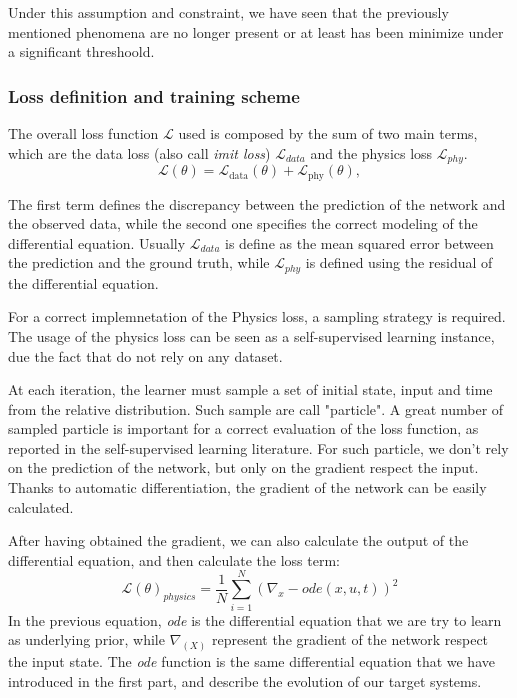 Under this assumption and constraint, we have seen that the previously mentioned phenomena are no longer present or at least has been minimize under a significant threshoold.

\subsubsection{Loss definition and training scheme}

The overall loss function $\mathcal{L}$ used is composed by the sum of two main terms, which are the data loss (also call \textit{imit loss}) $\mathcal{L}_{data}$ and the physics loss $\mathcal{L}_{phy}$. 
\begin{equation}
    \mathcal{L}(\theta) = \mathcal{L}_{\text{data}}(\theta) + \mathcal{L}_{\text{phy}}(\theta),
\end{equation}

The first term defines the discrepancy between the prediction of the network and the observed data, while the second one specifies the correct modeling of the differential equation.
Usually $\mathcal{L}_{data}$ is define as the mean squared error between the prediction and the ground truth, while $\mathcal{L}_{phy}$ is defined using the residual of the differential equation.

For a correct implemnetation of the Physics loss, a sampling strategy is required. The usage of the physics loss can be seen as a self-supervised learning instance, due the fact that do not rely on any dataset.

At each iteration, the learner must sample a set of initial state, input and time from the relative distribution. Such sample are call "particle". 
A great number of sampled particle is important for a correct evaluation of the loss function, as reported in the self-supervised learning literature. 
For such particle, we don't rely on the prediction of the network, but only on the gradient respect the input. Thanks to automatic differentiation, the gradient of the network can be easily calculated.

After having obtained the gradient, we can also calculate the output of the differential equation, and then calculate the loss term:
\begin{equation}
    \mathcal L(\theta)_{physics} = \frac{1}{N} \sum_{i=1}^{N} (\nabla_{x} -  \textit{ode}(x, u, t) )^2
\end{equation}
In the previous equation, \textit{ode} is the differential equation that we are try to learn as underlying prior, while $\nabla_(X)$ represent the gradient of the network respect the input state.
The \textit{ode} function is the same differential equation that we have introduced in the first part, and describe the evolution of our target systems.
\\


